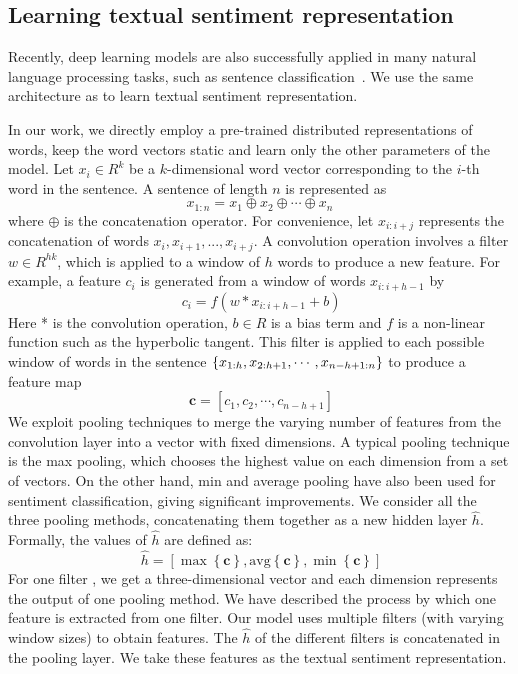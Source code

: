 \documentclass{article}
\def\x{{\mathbf x}}
\begin{document}
  \subsection{Learning textual sentiment representation}
 \label{ssec:subhead}

Recently, deep learning models are also successfully applied in many natural language processing tasks,  such as sentence classification~\cite{kim2014convolutional}. We use the same architecture as \cite{kim2014convolutional} to learn textual sentiment representation.

In our work, we directly employ a pre-trained distributed representations of words, keep the word vectors static and learn only the other parameters of the model.
Let $x_i \in R^k$ be a $k$-dimensional word vector corresponding to the $i$-th word in the sentence. A sentence of length $n$ is represented as
  \begin{equation}
  x_{1:n}= x_1 \oplus x_2 \oplus \cdots \oplus x_n
  \end{equation}
where $\oplus$ is the concatenation operator. For convenience, let $x_{i:i+j}$ represents the concatenation of words $x_i, x_{i+1},  . . . , x_{i+j}$. A convolution operation involves a filter $w \in R^{hk}$,  which is applied to a window of $h$ words to produce a new feature. For example, a feature $c_i$ is generated from a window of words $x_{i:i+h-1}$ by
  \begin{equation}\
    c_i = f(w * x_{i:i+h-1}+b)
  \end{equation}
Here * is the convolution operation, $b \in R$ is a bias term and $f$ is a non-linear function such as the hyperbolic tangent. This filter is applied to each possible window of words in the sentence $\left\{x_{1:h}, x_{2:h+1}, \cdots, \\x_{n-h+1:n}\right\}$ to produce a feature map
  \begin{equation}\
    \textbf{c} = [c_1, c_2, \cdots, c_{n-h+1}]
  \end{equation}
We exploit pooling techniques to merge the varying number of features from the convolution layer into a vector with fixed dimensions. A typical pooling technique is the max pooling, which chooses the highest value on each dimension from a set of vectors. On the other hand,  min and average pooling have also been used for sentiment classification\cite{vo2015target}, giving significant improvements. We consider all the three pooling methods,  concatenating them together as a new hidden layer $\hat{h}$. Formally, the values of $\hat{h}$ are defined as:
  \begin{equation}\
    \hat{h} = \left[ \max\left\{\textbf{c}\right\}, \mathrm{avg}\left\{\textbf{c}\right\}, \min\left\{\textbf{c}\right\} \right]
  \end{equation}
  For one filter , we get a three-dimensional vector and each dimension represents the output of one pooling method. We have described the process by which one feature is extracted from one filter. Our model uses multiple filters (with varying window sizes) to obtain features. The $\hat{h}$ of the different filters is concatenated in the pooling layer. We take these features as the textual sentiment representation.
\end{document}

